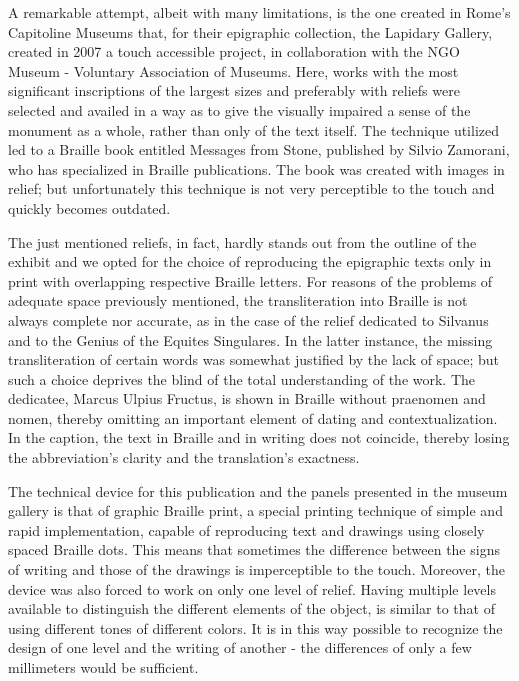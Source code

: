 \documentclass[amsthm,ebook]{saparticle}
\begin{document}
A remarkable attempt, albeit with many limitations, is the one created in Rome’s Capitoline Museums that, for their
epigraphic collection, the Lapidary Gallery, created in 2007 a touch accessible project, in collaboration with the NGO
Museum - Voluntary Association of Museums. Here, works with the most significant inscriptions of the largest sizes and
preferably with reliefs were selected and availed in a way as to give the visually impaired a sense of the monument as
a whole, rather than only of the text itself. The technique utilized led to a Braille book entitled Messages from
Stone, published by Silvio Zamorani, who has specialized in Braille publications. The book was created with images in
relief; but unfortunately this technique is not very perceptible to the touch and quickly becomes outdated.

The just mentioned reliefs, in fact, hardly stands out from the outline of the exhibit and we opted for the choice of
reproducing the epigraphic texts only in print with overlapping respective Braille letters. For reasons of the problems
of adequate space previously mentioned, the transliteration into Braille is not always complete nor accurate, as in the
case of the relief dedicated to Silvanus and to the Genius of the Equites Singulares. In the latter instance, the
missing transliteration of certain words was somewhat justified by the lack of space; but such a choice deprives the
blind of the total understanding of the work. The dedicatee, Marcus Ulpius Fructus, is shown in Braille without
praenomen and nomen, thereby omitting an important element of dating and contextualization. In the caption, the text in
Braille and in writing does not coincide, thereby losing the abbreviation’s clarity and the translation’s exactness.

The technical device for this publication and the panels presented in the museum gallery is that of graphic Braille
print, a special printing technique of simple and rapid implementation, capable of reproducing text and drawings using
closely spaced Braille dots. This means that sometimes the difference between the signs of writing and those of the
drawings is imperceptible to the touch. Moreover, the device was also forced to work on only one level of relief.
Having multiple levels available to distinguish the different elements of the object, is similar to that of using
different tones of different colors. It is in this way possible to recognize the design of one level and the writing of
another - the differences of only a few millimeters would be sufficient.
\end{document}
